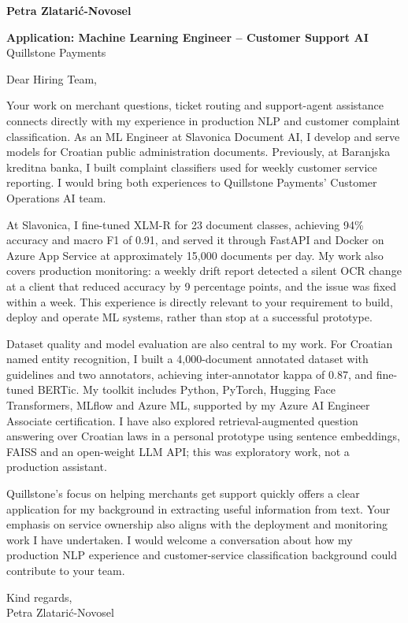 \documentclass[11pt,a4paper]{article}
\begin{document}
{\large\bfseries\color{primarycolor} Petra Zlatarić-Novosel}

\textbf{Application: Machine Learning Engineer – Customer Support AI}\\
Quillstone Payments

Dear Hiring Team,

Your work on merchant questions, ticket routing and support-agent assistance connects directly with my experience in production NLP and customer complaint classification. As an ML Engineer at Slavonica Document AI, I develop and serve models for Croatian public administration documents. Previously, at Baranjska kreditna banka, I built complaint classifiers used for weekly customer service reporting. I would bring both experiences to Quillstone Payments' Customer Operations AI team.

At Slavonica, I fine-tuned XLM-R for 23 document classes, achieving 94\% accuracy and macro F1 of 0.91, and served it through FastAPI and Docker on Azure App Service at approximately 15,000 documents per day. My work also covers production monitoring: a weekly drift report detected a silent OCR change at a client that reduced accuracy by 9 percentage points, and the issue was fixed within a week. This experience is directly relevant to your requirement to build, deploy and operate ML systems, rather than stop at a successful prototype.

Dataset quality and model evaluation are also central to my work. For Croatian named entity recognition, I built a 4,000-document annotated dataset with guidelines and two annotators, achieving inter-annotator kappa of 0.87, and fine-tuned BERTic. My toolkit includes Python, PyTorch, Hugging Face Transformers, MLflow and Azure ML, supported by my Azure AI Engineer Associate certification. I have also explored retrieval-augmented question answering over Croatian laws in a personal prototype using sentence embeddings, FAISS and an open-weight LLM API; this was exploratory work, not a production assistant.

Quillstone's focus on helping merchants get support quickly offers a clear application for my background in extracting useful information from text. Your emphasis on service ownership also aligns with the deployment and monitoring work I have undertaken. I would welcome a conversation about how my production NLP experience and customer-service classification background could contribute to your team.

Kind regards,\\
Petra Zlatarić-Novosel
\end{document}
